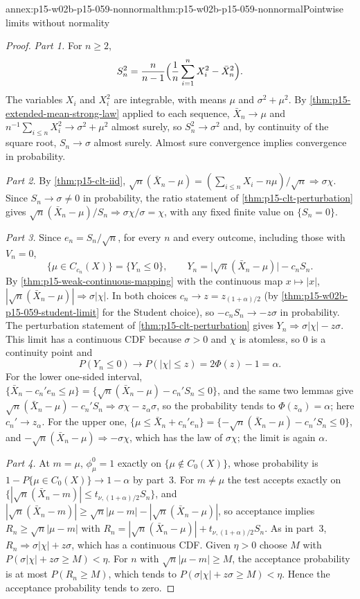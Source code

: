\begin{annexitem}{annex:p15-w02b-p15-059-nonnormal}{thm:p15-w02b-p15-059-nonnormal}{Pointwise limits without normality}
\begin{proof}
\emph{Part 1.} For \(n\geq2\),
\[
 S_n^2=\frac n{n-1}\Bigl(\frac1n\sum_{i=1}^nX_i^2-\bar X_n^2\Bigr).
\]
The variables \(X_i\) and \(X_i^2\) are integrable, with means \(\mu\) and
\(\sigma^2+\mu^2\). By \cref{thm:p15-extended-mean-strong-law} applied to
each sequence, \(\bar X_n\to\mu\) and \(n^{-1}\sum_{i\leq n}X_i^2\to
\sigma^2+\mu^2\) almost surely, so \(S_n^2\to\sigma^2\) and, by continuity
of the square root, \(S_n\to\sigma\) almost surely. Almost sure convergence
implies convergence in probability.

\emph{Part 2.} By \cref{thm:p15-clt-iid},
\(\sqrt n(\bar X_n-\mu)=(\sum_{i\leq n}X_i-n\mu)/\sqrt n\Rightarrow
\sigma\chi\). Since \(S_n\to\sigma\neq0\) in probability, the ratio
statement of \cref{thm:p15-clt-perturbation} gives
\(\sqrt n(\bar X_n-\mu)/S_n\Rightarrow\sigma\chi/\sigma=\chi\), with any
fixed finite value on \(\{S_n=0\}\).

\emph{Part 3.} Since \(e_n=S_n/\sqrt n\), for every \(n\) and every
outcome, including those with \(V_n=0\),
\[
 \{\mu\in C_{c_n}(X)\}=\{Y_n\leq0\},\qquad
 Y_n=\bigl|\sqrt n(\bar X_n-\mu)\bigr|-c_nS_n .
\]
By \cref{thm:p15-weak-continuous-mapping} with the continuous map
\(x\mapsto|x|\), \(|\sqrt n(\bar X_n-\mu)|\Rightarrow\sigma|\chi|\). In
both choices \(c_n\to z=z_{(1+\alpha)/2}\) (by
\cref{thm:p15-w02b-p15-059-student-limit} for the Student choice), so
\(-c_nS_n\to-z\sigma\) in probability. The perturbation statement of
\cref{thm:p15-clt-perturbation} gives
\(Y_n\Rightarrow\sigma|\chi|-z\sigma\). This limit has a continuous CDF
because \(\sigma>0\) and \(\chi\) is atomless, so \(0\) is a continuity
point and
\[
 P(Y_n\leq0)\to P(|\chi|\leq z)=2\Phi(z)-1=\alpha .
\]
For the lower one-sided interval,
\(\{\bar X_n-c_n'e_n\leq\mu\}=\{\sqrt n(\bar X_n-\mu)-c_n'S_n\leq0\}\), and
the same two lemmas give
\(\sqrt n(\bar X_n-\mu)-c_n'S_n\Rightarrow\sigma\chi-z_\alpha\sigma\), so
the probability tends to \(\Phi(z_\alpha)=\alpha\); here
\(c_n'\to z_\alpha\). For the upper one,
\(\{\mu\leq\bar X_n+c_n'e_n\}=\{-\sqrt n(\bar X_n-\mu)-c_n'S_n\leq0\}\),
and \(-\sqrt n(\bar X_n-\mu)\Rightarrow-\sigma\chi\), which has the law of
\(\sigma\chi\); the limit is again \(\alpha\).

\emph{Part 4.} At \(m=\mu\), \(\phi_\mu^0=1\) exactly on
\(\{\mu\notin C_0(X)\}\), whose probability is
\(1-P\{\mu\in C_0(X)\}\to1-\alpha\) by part~3. For \(m\neq\mu\) the test
accepts exactly on \(\{|\sqrt n(\bar X_n-m)|\leq t_{\nu,(1+\alpha)/2}S_n\}\),
and \(|\sqrt n(\bar X_n-m)|\geq\sqrt n|\mu-m|-|\sqrt n(\bar X_n-\mu)|\), so
acceptance implies \(R_n\geq\sqrt n|\mu-m|\) with
\(R_n=|\sqrt n(\bar X_n-\mu)|+t_{\nu,(1+\alpha)/2}S_n\). As in part~3,
\(R_n\Rightarrow\sigma|\chi|+z\sigma\), which has a continuous CDF. Given
\(\eta>0\) choose \(M\) with \(P(\sigma|\chi|+z\sigma\geq M)<\eta\). For
\(n\) with \(\sqrt n|\mu-m|\geq M\), the acceptance probability is at most
\(P(R_n\geq M)\), which tends to \(P(\sigma|\chi|+z\sigma\geq M)<\eta\).
Hence the acceptance probability tends to zero.


\end{proof}
\end{annexitem}
